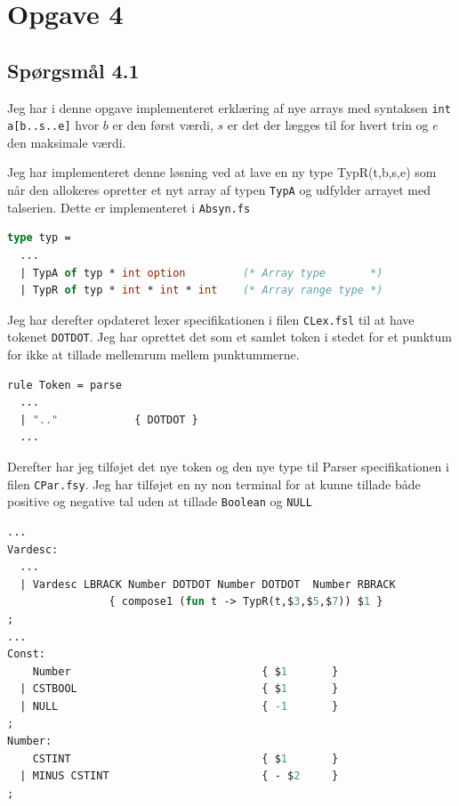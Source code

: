 \documentclass[danish,a4paper]{report}
\begin{document}
\chapter*{Opgave 4}
\section*{Spørgsmål 4.1}

Jeg har i denne opgave implementeret erklæring af nye arrays med syntaksen \texttt{int a[b..s..e]} hvor $b$ er den først værdi, $s$ er det der lægges til for hvert trin og $e$ den maksimale værdi.

Jeg har implementeret denne løsning ved at lave en ny type TypR(t,b,s,e) som når den allokeres opretter et nyt array af typen \texttt{TypA} og udfylder arrayet med talserien. Dette er implementeret i \texttt{Absyn.fs}

  \begin{lstlisting}[language=ML]
type typ =
  ...
  | TypA of typ * int option         (* Array type       *)
  | TypR of typ * int * int * int    (* Array range type *)
\end{lstlisting}

Jeg har derefter opdateret lexer specifikationen i filen \texttt{CLex.fsl} til at have tokenet \texttt{DOTDOT}. Jeg har oprettet det som et samlet token i stedet for et punktum for ikke at tillade mellemrum mellem punktummerne.

\begin{lstlisting}[language=ML]
rule Token = parse
  ...
  | ".."            { DOTDOT }
  ...
\end{lstlisting}

Derefter har jeg tilføjet det nye token og den nye type til Parser specifikationen i filen \texttt{CPar.fsy}. Jeg har tilføjet en ny non terminal for at kunne tillade både positive og negative tal uden at tillade \texttt{Boolean} og \texttt{NULL}

\begin{lstlisting}[language=ML]
%token BAR DOTDOT
...
Vardesc: 
  ... 
  | Vardesc LBRACK Number DOTDOT Number DOTDOT  Number RBRACK 
                { compose1 (fun t -> TypR(t,$3,$5,$7)) $1 }
;
...
Const:
    Number                              { $1       }
  | CSTBOOL                             { $1       }
  | NULL                                { -1       }
;
Number:
    CSTINT                              { $1       }
  | MINUS CSTINT                        { - $2     }
;
\end{lstlisting}
\end{document}
